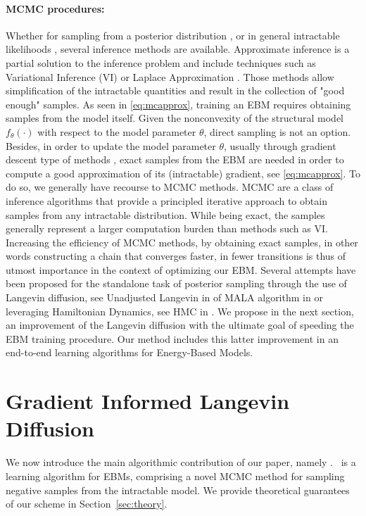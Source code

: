 \documentclass[10pt,twocolumn,letterpaper]{article}
\begin{document}
\paragraph{MCMC procedures: }
Whether for sampling from a posterior distribution \cite{mh:robert}, or in general intractable likelihoods \cite{doucet2000sequential}, several inference methods are available.
Approximate inference is a partial solution to the inference problem and include techniques such as Variational Inference (VI) \cite{jordanvi,freitas} or Laplace Approximation \cite{wolfinger,rue2009approximate}. 
Those methods allow simplification of the intractable quantities and result in the collection of "good enough" samples.
As seen in \eqref{eq:mcapprox}, training an EBM requires obtaining samples from the model itself.
Given the nonconvexity of the structural model $f_\theta(\cdot)$ with respect to the model parameter $\theta$, direct sampling is not an option.
Besides, in order to update the model parameter $\theta$, usually through gradient descent type of methods \cite{bottou2008},  exact samples from the EBM are needed in order to compute a good approximation of its (intractable) gradient, see \eqref{eq:mcapprox}.
To do so, we generally have recourse to MCMC methods.
MCMC are a class of inference algorithms that provide a principled iterative approach to obtain samples from any intractable distribution.
While being exact, the samples generally represent a larger computation burden than methods such as VI.
Increasing the efficiency of MCMC methods, by obtaining exact samples, in other words constructing a chain that converges faster, in fewer transitions is thus of utmost importance in the context of optimizing our EBM.
Several attempts have been proposed for the standalone task of posterior sampling through the use of Langevin diffusion, see Unadjusted Langevin in \cite{brosse2017tamed} of MALA algorithm in \cite{roberts,robertsmala,durmus2017fast} or leveraging Hamiltonian Dynamics, see HMC in \cite{girolami}.
We propose in the next section, an improvement of the Langevin diffusion with the ultimate goal of speeding the EBM training procedure.
Our method includes this latter improvement in an end-to-end learning algorithms for Energy-Based Models.

\section{Gradient Informed Langevin Diffusion}\label{sec:main}

We now introduce the main algorithmic contribution of our paper, namely \algo.
\algo\ is a learning algorithm for EBMs, comprising a novel MCMC method for sampling negative samples from the intractable model.
We provide theoretical guarantees of our scheme in Section~\ref{sec:theory}.
\end{document}
